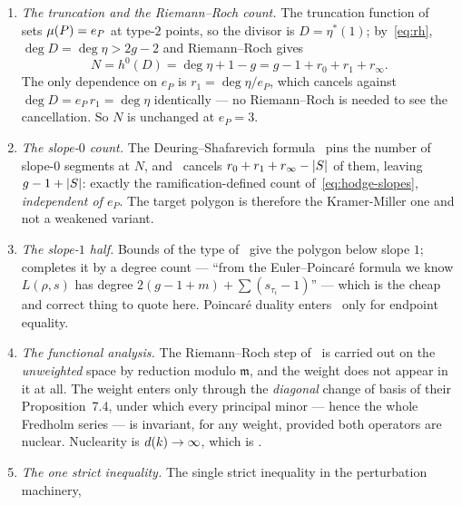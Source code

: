 \begin{enumerate}[label=\textup{(C\arabic*)},leftmargin=*,itemsep=3pt]
\item\label{C1} \emph{The truncation and the Riemann--Roch count.} The
  truncation function of~\cite[\S6]{kramermillerupton2021newton} sets $\mu(P) = e_P$ at
  type-$2$ points, so the divisor is $D = \eta^*(1)$; by~\eqref{eq:rh},
  $\deg D = \deg\eta > 2g-2$ and Riemann--Roch gives
  \begin{equation}
  \label{eq:N-count}
    N = h^0(D) = \deg\eta + 1 - g = g - 1 + r_0 + r_1 + r_\infty .
  \end{equation}
  The only dependence on $e_P$ is $r_1 = \deg\eta/e_P$, which cancels
  against $\deg D = e_P\,r_1 = \deg\eta$ identically --- no Riemann--Roch is
  needed to see the cancellation. So $N$ is unchanged at $e_P = 3$.
\item\label{C2} \emph{The slope-$0$ count.} The Deuring--Shafarevich
  formula~\cite{crew1984etale} pins the
  number of slope-$0$ segments at $N$, and~\cite[Corollary 7.14]{kramermillerupton2021newton} cancels $r_0+r_1+r_\infty -
  |S|$ of them, leaving $g-1+|S|$: exactly the ramification-defined
  count of~\eqref{eq:hodge-slopes}, \emph{independent of $e_P$}. The target
  polygon is therefore the Kramer-Miller one and not a weakened variant.
\item\label{C3} \emph{The slope-$1$ half.} Bounds of the type of~\cite[Corollary 6.8]{kramermillerupton2021newton} give the polygon below slope $1$;
  \cite[\S7.3]{kramermiller2020abelian} completes it by a degree count ---
  ``from the Euler--Poincar\'e formula we know $L(\rho,s)$ has degree
  $2(g-1+m) + \sum(s_{\tau_i}-1)$'' --- which is the cheap and correct thing
  to quote here. Poincar\'e duality enters~\cite{kramermiller2020abelian} only for endpoint equality.
\item\label{C4} \emph{The functional analysis.} The Riemann--Roch step of~\cite[Proposition 7.2]{kramermiller2020abelian} is carried out on the
  \emph{unweighted} space by reduction modulo $\mathfrak{m}$, and the weight
  does not appear in it at all. The weight enters only through the
  \emph{diagonal} change of basis of their Proposition~7.4, under which
  every principal minor --- hence the whole Fredholm series --- is
  invariant, for any weight, provided both operators are nuclear. Nuclearity
  is $d(k)\to\infty$, which is .
\item\label{C5} \emph{The one strict inequality.} The single strict
  inequality in the perturbation machinery,

\end{enumerate}
